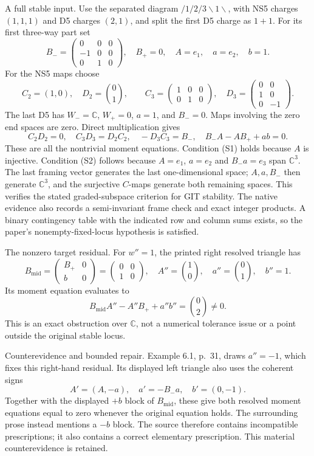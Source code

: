\documentclass[10pt]{article}
\begin{document}
A full stable input. Use the separated diagram \(/1/2/3\backslash1\backslash\), with NS5 charges \((1,1,1)\) and D5 charges \((2,1)\), and split the first D5 charge as \(1+1\). For its first three-way part set \[B_-=\begin{pmatrix}0&0&0\\-1&0&0\\0&1&0\end{pmatrix},
 \quad B_+=0,\quad A=e_1,\quad a=e_2,\quad b=1.\] For the NS5 maps choose \[C_2=(1,0),\quad D_2=\binom01,\qquad
 C_3=\begin{pmatrix}1&0&0\\0&1&0\end{pmatrix},\quad
 D_3=\begin{pmatrix}0&0\\1&0\\0&-1\end{pmatrix}.\] The last D5 has \(W_-=\mathbb C\), \(W_+=0\), \(a=1\), and \(B_-=0\). Maps involving the zero end spaces are zero. Direct multiplication gives \[C_2D_2=0,\quad C_3D_3=D_2C_2,\quad -D_3C_3=B_-,
 \quad B_-A-AB_++ab=0.\] These are all the nontrivial moment equations. Condition (S1) holds because \(A\) is injective. Condition (S2) follows because \(A=e_1\), \(a=e_2\) and \(B_-a=e_3\) span \(\mathbb C^3\). The last framing vector generates the last one-dimensional space; \(A,a,B_-\) then generate \(\mathbb C^3\), and the surjective \(C\)-maps generate both remaining spaces. This verifies the stated graded-subspace criterion for GIT stability. The native evidence also records a semi-invariant frame check and exact integer products. A binary contingency table with the indicated row and column sums exists, so the paper’s nonempty-fixed-locus hypothesis is satisfied.\par
The nonzero target residual. For \(w''=1\), the printed right resolved triangle has \[B_{\mathrm{mid}}=\begin{pmatrix}B_+&0\\b&0\end{pmatrix}
 =\begin{pmatrix}0&0\\1&0\end{pmatrix},\quad
 A''=\binom10,\quad a''=\binom01,\quad b''=1.\] Its moment equation evaluates to \[B_{\mathrm{mid}}A''-A''B_++a''b''=\binom02\ne0.\] This is an exact obstruction over \(\mathbb C\), not a numerical tolerance issue or a point outside the original stable locus.\par
Counterevidence and bounded repair. Example 6.1, p. 31, draws \(a''=-1\), which fixes this right-hand residual. Its displayed left triangle also uses the coherent signs \[A'=(A,-a),\quad a'=-B_-a,\quad b'=(0,-1).\] Together with the displayed \(+b\) block of \(B_{\mathrm{mid}}\), these give both resolved moment equations equal to zero whenever the original equation holds. The surrounding prose instead mentions a \(-b\) block. The source therefore contains incompatible prescriptions; it also contains a correct elementary prescription. This material counterevidence is retained.\par
\end{document}
